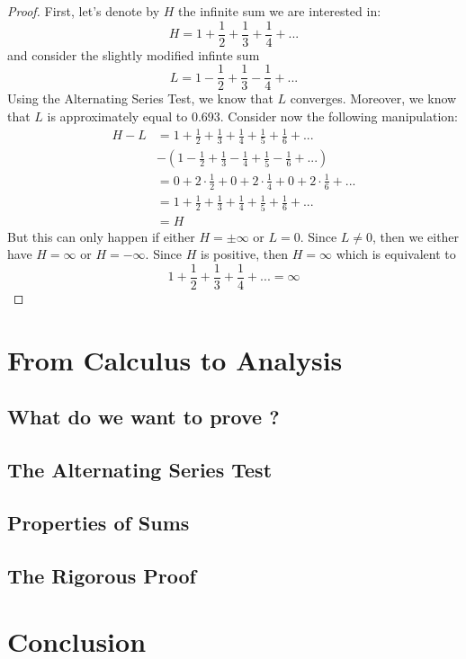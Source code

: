 \documentclass[12pt]{article}
\theoremstyle{definition}
\begin{document}
\begin{proof}
    First, let's denote by $H$ the infinite sum we are interested in:
    $$H = 1 + \frac{1}{2} + \frac{1}{3} + \frac{1}{4} + ...$$
    and consider the slightly modified infinte sum
    $$L = 1 - \frac{1}{2} + \frac{1}{3} - \frac{1}{4} + ...$$
    Using the Alternating Series Test, we know that $L$ converges. Moreover, we know that $L$ is approximately equal to 0.693. Consider now the following manipulation:
    \begin{align*}
        H - L &= 1 + \frac{1}{2} + \frac{1}{3} + \frac{1}{4} + \frac{1}{5} + \frac{1}{6} + ... \\
        & - \left(1 - \frac{1}{2} + \frac{1}{3} - \frac{1}{4} + \frac{1}{5} - \frac{1}{6} + ...\right) \\
        &= 0 + 2\cdot \frac{1}{2} + 0 + 2\cdot \frac{1}{4} + 0 + 2\cdot \frac{1}{6} + ... \\
        &= 1 + \frac{1}{2} + \frac{1}{3} + \frac{1}{4} + \frac{1}{5} + \frac{1}{6} + ... \\
        &= H
    \end{align*}
    But this can only happen if either $H = \pm \infty$ or $L = 0$. Since $L \neq 0$, then we either have $H = \infty$ or $H = -\infty$. Since $H$ is positive, then $H = \infty$ which is equivalent to
    $$ 1 + \frac{1}{2} + \frac{1}{3} + \frac{1}{4} + ... = \infty$$
\end{proof}

\section{From Calculus to Analysis}

\subsection{What do we want to prove ?}

\subsection{The Alternating Series Test}

\subsection{Properties of Sums}

\subsection{The Rigorous Proof}

\section{Conclusion}


\newpage


\end{document}
